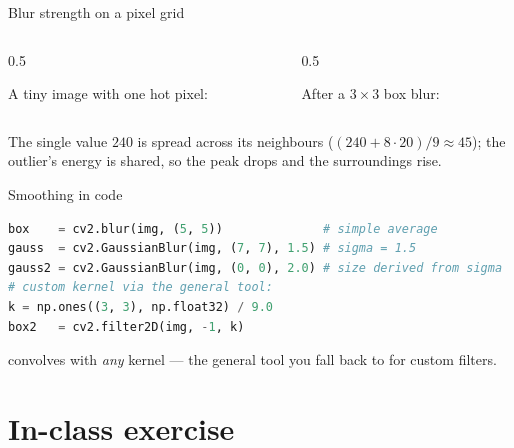 \documentclass[10pt,aspectratio=169]{beamer}
\begin{document}
\begin{frame}{Blur strength on a pixel grid}
  \begin{columns}[T]
    \begin{column}{0.5\textwidth}
      \begin{center}
      A tiny image with one hot pixel:\\[3pt]
      \end{center}
    \end{column}
    \begin{column}{0.5\textwidth}
      \begin{center}
      After a $3\times3$ box blur:\\[3pt]
      \end{center}
    \end{column}
  \end{columns}
  \vspace{2pt}
  The single value $240$ is spread across its neighbours ($(240+8\cdot20)/9\approx45$); the
  outlier's energy is shared, so the peak drops and the surroundings rise.
\end{frame}

\begin{frame}[fragile]{Smoothing in code}
\begin{lstlisting}[language=Python]
box    = cv2.blur(img, (5, 5))              # simple average
gauss  = cv2.GaussianBlur(img, (7, 7), 1.5) # sigma = 1.5
gauss2 = cv2.GaussianBlur(img, (0, 0), 2.0) # size derived from sigma
# custom kernel via the general tool:
k = np.ones((3, 3), np.float32) / 9.0
box2   = cv2.filter2D(img, -1, k)
\end{lstlisting}
   convolves with \emph{any} kernel — the general tool you fall back to for custom filters.
\end{frame}

\section{In-class exercise}
\end{document}
